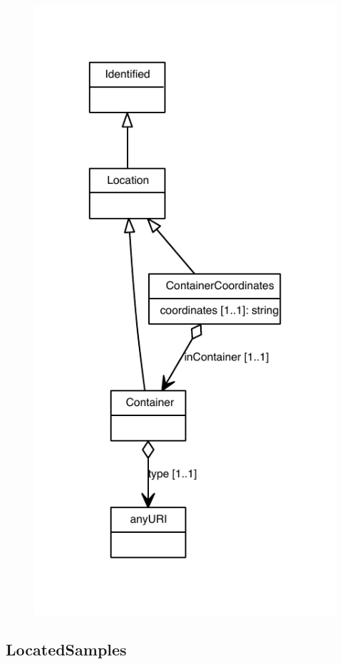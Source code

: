 \begin{figure}[ht]
\begin{center}
\includegraphics[scale=0.8]{uml/Location_abstraction_hierarchy.pdf}
\end{center}
\end{figure}

\subsection{LocatedSamples}
\label{sec:LocatedSamples}

